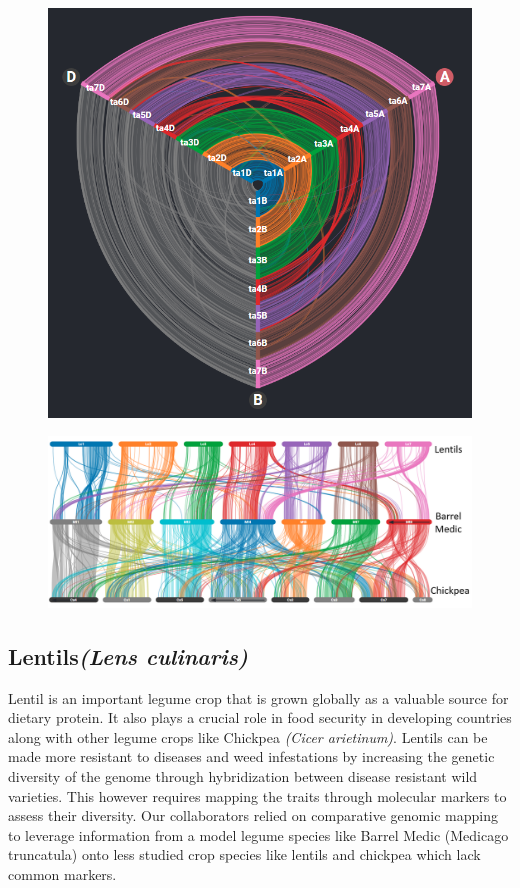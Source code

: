 \begin{figure}
  \centering
  \includegraphics[width=0.65\linewidth]{images/ch_6_wheat.PNG}
  \label{fig:ch_6_wheat}
\end{figure}


\begin{figure}
  \centering
  \includegraphics[width=1\linewidth]{images/ch_6_lentils.png}
  \label{fig:ch_6_lentils}
\end{figure}


\subsection{Lentils\textit{(Lens culinaris)}}
Lentil is an important legume crop that is grown globally as a valuable source for dietary protein. It also plays a crucial role in food security in developing countries along with other legume crops like Chickpea \textit{(Cicer arietinum)}\cite{varshney2013draft}. Lentils can be made more resistant to diseases and weed infestations by increasing the genetic diversity of the genome through hybridization between disease resistant wild varieties. This however requires mapping the traits through molecular markers to assess their diversity. Our collaborators relied on comparative genomic mapping to leverage information from a model legume species like Barrel Medic (Medicago truncatula) onto less studied crop species like lentils and chickpea which lack common markers.


